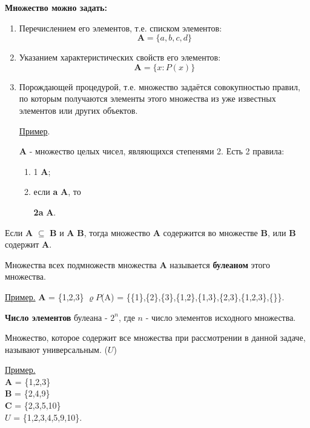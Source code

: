 \documentclass[12pt, a4paper, oneside]{article}
\theoremstyle{plain} %
\theoremstyle{definition}
\newcommand{\indef}[1]{\textbf{ \color{dark_red} #1}}
\begin{document}
 \indef{Множество можно задать:}
 \begin{enumerate}
    
     \item Перечислением его элементов, т.е. списком элементов: \[\textbf{A} = \{a,b,c,d\} \]
     
     \item Указанием характеристических свойств его элементов:
     \[\textbf{A} = \{x:P(x)\} \]
     
     \item Порождающей процедурой, т.е. множество задаётся совокупностью правил, по которым получаются элементы этого множества из уже известных элементов или других объектов. \par
     
     \underline{Пример}.
     
     \textbf{A} - множество целых чисел, являющихся степенями 2. Есть 2 правила:
     
     \begin{enumerate}
             \item 1 \in \hspace{1mm}\textbf{A};
     
             \item если \textbf{a} \in \hspace{1mm} \textbf{A}, то 
             
             \textbf{2a} \in \hspace{1mm} \textbf{A}.
     \end{enumerate}
     
     \end{enumerate} \par

Если \textbf{A} \(\subseteq\) \textbf{B} и \textbf{A} \neq \hspace{2mm} \textbf{B}, тогда множество \textbf{A} содержится во множестве \textbf{B}, или \textbf{B} содержит \textbf{A}. 
\par

Множества всех подмножеств множества \textbf{A} называется \indef{булеаном} этого множества. \par

\underline{Пример.}\hspace{2mm} \textbf{A} = \{1,2,3\} \Rightarrow
\(\varrho P\)(A) = \{\{1\},\{2\},\{3\},\{1,2\},\{1,3\},\{2,3\},\{1,2,3\},\{\varnothing\}\}. \par

\textbf{Число элементов} булеана - \(2^n\), где \(n\) - число элементов исходного множества. \par
Множество, которое содержит все множества при рассмотрении в данной задаче, называют универсальным. (\(U\)) \par 
\underline{Пример.} \\
\textbf{A} = \{1,2,3\} \\
\textbf{B} = \{2,4,9\} \\
\textbf{C} = \{2,3,5,10\} \\
\Rightarrow \(U\) = \{1,2,3,4,5,9,10\}. 
\end{document}
